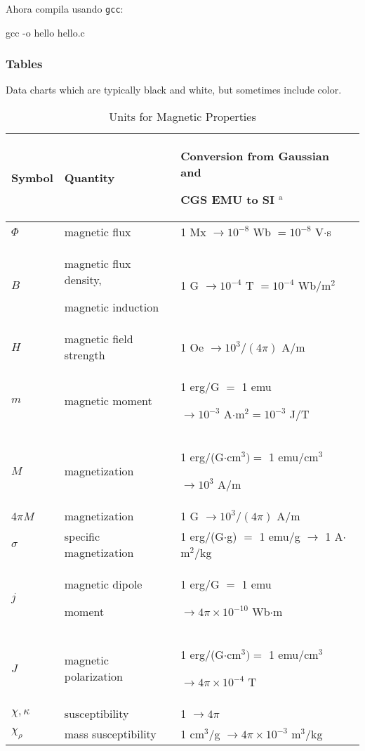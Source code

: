 \documentclass[a4paper]{IEEEtran} %
\begin{document}
\noindent
Ahora compila usando \texttt{gcc}:

\begin{listing}[style=consola, numbers=none]
gcc  -o hello hello.c
\end{listing}

\subsubsection{Tables}
{Data charts which are typically black and white, but sometimes include 
color.}

\begin{table}
\caption{Units for Magnetic Properties}
\label{table}
\setlength{\tabcolsep}{3pt}
\begin{tabular}{|p{25pt}|p{75pt}|p{115pt}|}
\hline
Symbol& 
Quantity& 
Conversion from Gaussian and \par CGS EMU to SI $^{\mathrm{a}}$ \\
\hline
$\Phi $& 
magnetic flux& 
1 Mx $\to  10^{-8}$ Wb $= 10^{-8}$ V$\cdot $s \\
$B$& 
magnetic flux density, \par magnetic induction& 
1 G $\to  10^{-4}$ T $= 10^{-4}$ Wb/m$^{2}$ \\
$H$& 
magnetic field strength& 
1 Oe $\to  10^{3}/(4\pi )$ A/m \\
$m$& 
magnetic moment& 
1 erg/G $=$ 1 emu \par $\to 10^{-3}$ A$\cdot $m$^{2} = 10^{-3}$ J/T \\
$M$& 
magnetization& 
1 erg/(G$\cdot $cm$^{3}) =$ 1 emu/cm$^{3}$ \par $\to 10^{3}$ A/m \\
4$\pi M$& 
magnetization& 
1 G $\to  10^{3}/(4\pi )$ A/m \\
$\sigma $& 
specific magnetization& 
1 erg/(G$\cdot $g) $=$ 1 emu/g $\to $ 1 A$\cdot $m$^{2}$/kg \\
$j$& 
magnetic dipole \par moment& 
1 erg/G $=$ 1 emu \par $\to 4\pi \times  10^{-10}$ Wb$\cdot $m \\
$J$& 
magnetic polarization& 
1 erg/(G$\cdot $cm$^{3}) =$ 1 emu/cm$^{3}$ \par $\to 4\pi \times  10^{-4}$ T \\
$\chi , \kappa $& 
susceptibility& 
1 $\to  4\pi $ \\
$\chi_{\rho }$& 
mass susceptibility& 
1 cm$^{3}$/g $\to  4\pi \times  10^{-3}$ m$^{3}$/kg \\

\end{tabular}
\end{table}
\end{document}
